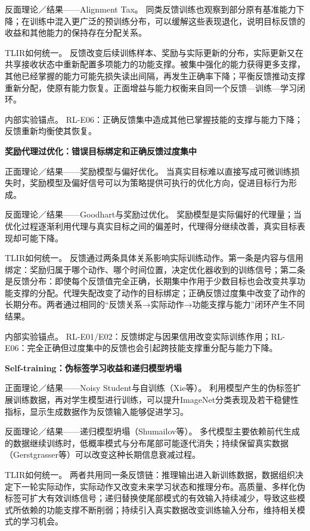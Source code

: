 反面理论／结果——Alignment Tax。 同类反馈训练也观察到部分原有基准能力下降；在训练中混入更广泛的预训练分布，可以缓解这些表现退化，说明目标反馈的收益和其他能力的保持存在分配关系。

TLIR如何统一。 反馈改变后续训练样本、奖励与实际更新的分布，实际更新又在共享接收状态中重新配置多项能力的功能支撑。被集中强化的能力获得更多支撑，其他已经掌握的能力可能先损失读出间隔，再发生正确率下降；平衡反馈推动支撑重新分配，使原有能力恢复。正面增益与能力权衡来自同一个反馈—训练—学习闭环。

内部实验锚点。 RL-E06：正确反馈集中造成其他已掌握技能的支撑与能力下降；反馈重新均衡使其恢复。

\noindent\textbf{奖励代理过优化：错误目标绑定和正确反馈过度集中}\par

正面理论／结果——奖励模型与偏好优化。 当真实目标难以直接写成可微训练损失时，奖励模型及偏好信号可以为策略提供可执行的优化方向，促进目标行为形成。

反面理论／结果——Goodhart与奖励过优化。 \cite{gao2023} 奖励模型是实际偏好的代理量；当优化过程逐渐利用代理与真实目标之间的偏差时，代理得分继续改善，真实目标表现却可能下降。

TLIR如何统一。 反馈通过两条具体关系影响实际训练动作。第一条是内容与信用绑定：奖励归属于哪个动作、哪个时间位置，决定优化器收到的训练信号；第二条是反馈分布：即使每个反馈值完全正确，长期集中作用于少数目标也会改变共享功能支撑的分配。代理失配改变了动作的目标绑定；正确反馈过度集中改变了动作的长期分布。两者通过相同的“反馈关系→实际动作→功能支撑与能力”闭环产生不同结果。

内部实验锚点。 RL-E01/E02：反馈绑定与因果信用改变实际训练作用；RL-E06：完全正确但过度集中的反馈也会引起跨技能支撑重分配与能力下降。

\noindent\textbf{Self-training：伪标签学习收益和递归模型坍塌}\par

正面理论／结果——Noisy Student与自训练（Xie等）。 \cite{xie2020} 利用模型产生的伪标签扩展训练数据，再对学生模型进行训练，可以提升ImageNet分类表现及若干稳健性指标，显示生成数据作为反馈输入能够促进学习。

反面理论／结果——递归模型坍塌（Shumailov等）。 \cite{shumailov2024,gerstgrasser2024} 多代模型主要依赖前代生成的数据继续训练时，低概率模式与分布尾部可能逐代消失；持续保留真实数据（Gerstgrasser等）可以改变这种长期信息衰减过程。

TLIR如何统一。 两者共用同一条反馈链：推理输出进入新训练数据，数据组织决定下一轮实际动作，实际动作又改变未来学习状态和推理分布。高质量、多样化伪标签可扩大有效训练信号；递归替换使尾部模式的有效输入持续减少，导致这些模式所依赖的功能支撑不断削弱；持续引入真实数据改变训练输入分布，维持相关模式的学习机会。

